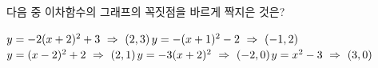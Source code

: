 다음 중 이차함수의 그래프의 꼭짓점을 바르게 짝지은 것은?
\begin{choicesv}{$y=-2(x+2)^2+3 \ \Rightarrow\ (2{,}\mkern3mu 3)$}{$y=-(x+1)^2-2 \ \Rightarrow\ (-1{,}\mkern3mu 2)$}{$y=(x-2)^2+2 \ \Rightarrow\ (2{,}\mkern3mu 1)$}{$y=-3(x+2)^2 \ \Rightarrow\ (-2{,}\mkern3mu 0)$}{$y=x^2-3 \ \Rightarrow\ (3{,}\mkern3mu 0)$}\end{choicesv}
